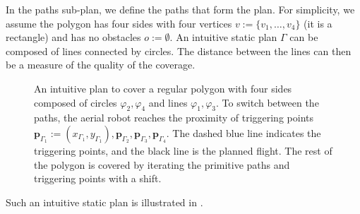 In the paths sub-plan, we define the paths that form the plan. For simplicity, we assume the polygon has four sides with four vertices $v:=\{v_1,\dots,v_4\}$ (it is a rectangle) and has no obstacles $o:=\emptyset$. An intuitive static plan $\Gamma$ can be composed of lines connected by circles. The distance between the lines can then be a measure of the quality of the coverage.
\begin{figure}[h!]
  \centering
  
  \caption[Intuitive plan to cover a regular polygon with four sides]{An intuitive plan to cover a regular polygon with four sides composed of circles $\varphi_2,\varphi_4$ and lines $\varphi_1,\varphi_3$. To switch between the paths, the aerial robot reaches the proximity of triggering points $\mathbf{p}_{\Gamma_1}:=(x_{\Gamma_1},y_{\Gamma_1}),\mathbf{p}_{\Gamma_2},\mathbf{p}_{\Gamma_3},\mathbf{p}_{\Gamma_4}$. The dashed blue line indicates the triggering points, and the black line is the planned flight. The rest of the polygon is covered by iterating the primitive paths and triggering points with a shift.}
  \label{fig:bm-like_pb}
\end{figure}
Such an intuitive static plan is illustrated in .

